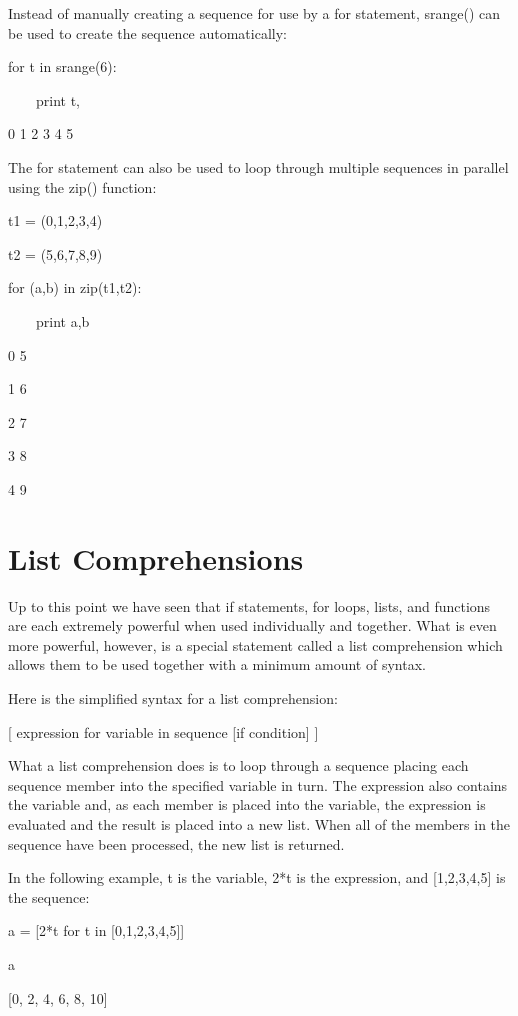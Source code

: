 \documentclass[12pt,oneside]{book}
\begin{document}
Instead of manually creating a sequence for use by a for statement, srange() can be used to create the sequence automatically:


for t in srange(6):

\ \ \ \ print t,

{\textbar}

0 1 2 3 4 5


The for statement can also be used to loop through multiple sequences in parallel using the zip() function: 

t1 = (0,1,2,3,4)

t2 = (5,6,7,8,9)

for (a,b) in zip(t1,t2):

\ \ \ \ print a,b

{\textbar}

0 5

1 6

2 7

3 8

4 9

\section[List Comprehensions]{List Comprehensions}

Up to this point we have seen that if statements, for loops, lists, and functions are each extremely powerful when used individually and together. What is even more powerful, however, is a special statement called a list comprehension which allows them to be used together with a minimum amount of syntax. 

Here is the simplified syntax for a list comprehension:


[ expression for variable in sequence [if condition] ]


What a list comprehension does is to loop through a sequence placing each sequence member into the specified variable in turn. The expression also contains the variable and, as each member is placed into the variable, the expression is evaluated and the result is placed into a new list. When all of the members in the sequence have been processed, the new list is returned. 


In the following example, t is the variable, 2*t is the expression, and [1,2,3,4,5] is the sequence: 

a = [2*t for t in [0,1,2,3,4,5]]

a

{\textbar}

[0, 2, 4, 6, 8, 10]
\end{document}
